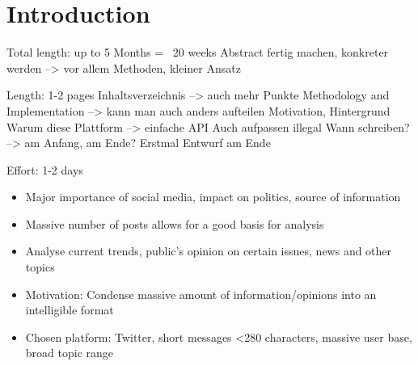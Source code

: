 \chapter{Introduction}
\label{cha:Chapter1_Introduction}
Total length: up to 5 Months = ~20 weeks
Abstract fertig machen, konkreter werden --> vor allem Methoden, kleiner Ansatz

Length: 1-2 pages
Inhaltsverzeichnis --> auch mehr Punkte
Methodology and Implementation --> kann man auch anders aufteilen
Motivation, Hintergrund
Warum diese Plattform --> einfache API
Auch aufpassen illegal
Wann schreiben? --> am Anfang, am Ende? Erstmal Entwurf am Ende

Effort: 1-2 days
\begin{itemize}
\item Major importance of social media, impact on politics, source of information
\item Massive number of posts allows for a good basis for analysis
\item Analyse current trends, public's opinion on certain issues, news and other topics
\item Motivation: Condense massive amount of information/opinions into an intelligible format
\item Chosen platform: Twitter, short messages <280 characters, massive user base, broad topic range
\end{itemize}

